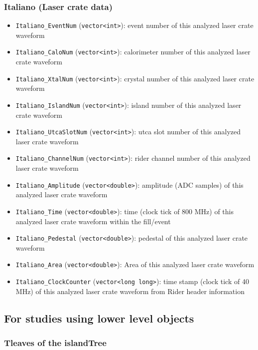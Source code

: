\subsubsection*{Italiano (Laser crate data)}
\begin{itemize}
\item \verb+Italiano_EventNum+ (\verb+vector<int>+): event number of this analyzed laser crate waveform
\item \verb+Italiano_CaloNum+ (\verb+vector<int>+): calorimeter number of this analyzed laser crate waveform
\item \verb+Italiano_XtalNum+ (\verb+vector<int>+): crystal number of this analyzed laser crate waveform
\item \verb+Italiano_IslandNum+ (\verb+vector<int>+): island number of this analyzed laser crate waveform
\item \verb+Italiano_UtcaSlotNum+ (\verb+vector<int>+): utca slot number of this analyzed laser crate waveform
\item \verb+Italiano_ChannelNum+ (\verb+vector<int>+): rider channel number of this analyzed laser crate waveform
\item \verb+Italiano_Amplitude+ (\verb+vector<double>+): amplitude (ADC samples) of this analyzed laser crate waveform
\item \verb+Italiano_Time+ (\verb+vector<double>+): time (clock tick of 800 MHz) of this analyzed laser crate waveform within the fill/event
\item \verb+Italiano_Pedestal+ (\verb+vector<double>+): pedestal of this analyzed laser crate waveform
\item \verb+Italiano_Area+ (\verb+vector<double>+): Area of this analyzed laser crate waveform
\item \verb+Italiano_ClockCounter+ (\verb+vector<long long>+): time stamp (clock tick of 40 MHz) of this analyzed laser crate waveform from Rider header information
\end{itemize}

\subsection*{For studies using lower level objects}

\subsubsection*{Tleaves of the islandTree}

